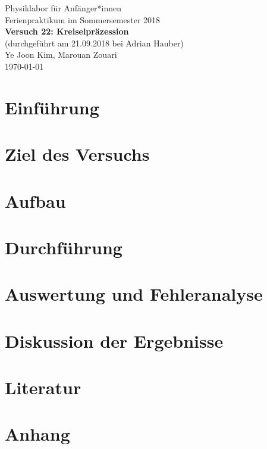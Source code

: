 \documentclass[11pt,a4paper]{article} %
\begin{document}
{
	\centering 
	\large 
	Physiklabor für Anfänger*innen \\
	Ferienpraktikum im Sommersemester 2018 \\[4mm]
	\textbf{\LARGE 
		Versuch 22: Kreiselpräzession
	} \\[3mm]
	(durchgeführt am 21.09.2018 bei Adrian Hauber) \\
	Ye Joon Kim, Marouan Zouari\\
	\today \\[10mm]
}

\section{Einführung}



\section{Ziel des Versuchs}

\section{Aufbau}

\section{Durchführung}

\section{Auswertung und Fehleranalyse}

\section{Diskussion der Ergebnisse}

\section{Literatur}

\section{Anhang}
\end{document}
